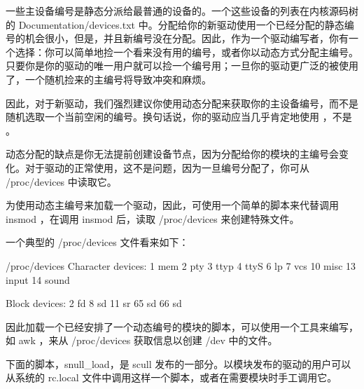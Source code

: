 \documentclass[lang=cn,newtx,10pt,scheme=chinese]{elegantbook}
\begin{document}
一些主设备编号是静态分派给最普通的设备的。一个这些设备的列表在内核源码树的 Documentation/devices.txt 中。分配给你的新驱动使用一个已经分配的静态编号的机会很小，但是，并且新编号没在分配。因此，作为一个驱动编写者，你有一个选择：你可以简单地捡一个看来没有用的编号，或者你以动态方式分配主编号。只要你是你的驱动的唯一用户就可以捡一个编号用；一旦你的驱动更广泛的被使用了，一个随机捡来的主编号将导致冲突和麻烦。

因此，对于新驱动，我们强烈建议你使用动态分配来获取你的主设备编号，而不是随机选取一个当前空闲的编号。换句话说，你的驱动应当几乎肯定地使用 ，不是  。

动态分配的缺点是你无法提前创建设备节点，因为分配给你的模块的主编号会变化。对于驱动的正常使用，这不是问题，因为一旦编号分配了，你可从 /proc/devices 中读取它。

为使用动态主编号来加载一个驱动，因此，可使用一个简单的脚本来代替调用 insmod ，在调用 insmod 后，读取 /proc/devices 来创建特殊文件。

一个典型的 /proc/devices 文件看来如下：

\begin{mycode}{/proc/devices}
Character devices:
1  mem
2  pty
3  ttyp
4  ttyS
6  lp
7  vcs
10 misc
13 input
14 sound

Block devices:
2  fd
8  sd
11 sr
65 sd
66 sd
\end{mycode}

因此加载一个已经安排了一个动态编号的模块的脚本，可以使用一个工具来编写，如 awk ，来从 /proc/devices 获取信息以创建 /dev 中的文件。

下面的脚本，snull\_load，是 scull 发布的一部分。以模块发布的驱动的用户可以从系统的 rc.local 文件中调用这样一个脚本，或者在需要模块时手工调用它。

\end{document}
